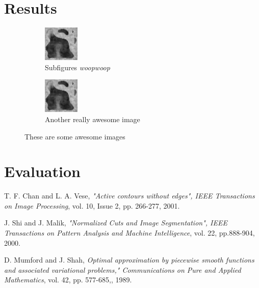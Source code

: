 \documentclass{article}
\begin{document}
  \section{Results}
  {
    \begin{figure}[h]
      \centering
      \begin{subfigure}[t]{0.45\linewidth}
        \centering
        \includegraphics{test.png}
        \caption{Subfigures \textit{woopwoop}}
      \end{subfigure}
      \hfill
      \begin{subfigure}[t]{0.45\linewidth}
        \centering
        \includegraphics{test.png}
        \caption{Another really awesome image}
      \end{subfigure}
      \caption{These are some awesome images}
    \end{figure}
  }
  \pagebreak
  \section{Evaluation}
  
  
  \begin{thebibliography}{9}
    
    \bibitem{[ChanVese01]}
    T. F. Chan and L. A. Vese,
    \emph{"Active contours without edges", IEEE Transactions on Image Processing},
    vol. 10, Issue 2, pp. 266-277, 2001.
    
    
    \bibitem{[ShiMalik00]}
    J.  Shi  and  J.  Malik,
    \emph{"Normalized Cuts and Image Segmentation", IEEE Transactions on Pattern Analysis and Machine Intelligence},
    vol. 22, pp.888-904,
    2000.
    
    \bibitem{[MumfordShah89]}
    D. Mumford and J. Shah,
    \emph{Optimal approximation by piecewise smooth functions and associated
      variational problems," Communications on Pure and Applied Mathematics},
    vol. 42, pp. 577-685,,
    1989.
    
  \end{thebibliography}
  
\end{document}

